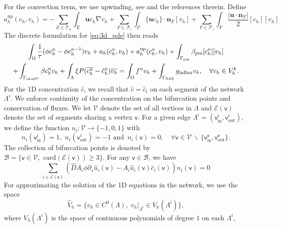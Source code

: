 \documentclass[fleqn,10pt]{wlscirep}
\newcommand{\spinal}{\Gamma_{\rm SAS}}
\newcommand{\gin}{g_{\rm{influx}}}
\begin{document}
For the convection term, we use upwinding, see \cite[Section 2.3.1]{di2011mathematical} and the references therein. Define 
\begin{equation*}
a_h^{\mathrm{up}}(c_h, v_h) =- \sum_{E\in\mathcal{T}_h } \int_E \bm{u} c_h \nabla v_h  + \sum_{F \in \mathcal{F}_i } \int_F \{ \bm u  c_h\} \cdot \bm{n}_F [v_h]  + \sum_{F \in \mathcal{F}_i} \int_F \frac{|\bm u \cdot \bm n_F |}{2} [c_h ] [v_h ] 
\end{equation*}
The discrete formulation for \eqref{eq:3d_pde} then reads 
\begin{multline}
\int_{\Omega}\frac{1}{\tau} (\phi c_h^n - \phi c_h^{n-1}) v_h + a_h(c_h^n, v_h) + a_h^{\mathrm{up}}(c_h^n,v_h) + \int_{\Gamma_{\mathrm{pia}} } \beta_{\mathrm{pia}}[c_h^n][v_h]  \\ + \int_{\Gamma_{\rm skull^u}} \beta c_h^n v_h +  \int_{\Lambda} \xi  P (\overline{c_h^n} - \hat c_h^n) \overline{v_h}  = \int_{\Omega} f^n v_h + \int_{\spinal} \gin v_h , \quad \forall v_h \in V_h^k.
\end{multline}
For the 1D concentration $\hat c$, we recall that $\hat c = \hat c_i $ on each segment of the network $\Lambda^i$.  We enforce continuity of the concentration on the bifurcation points and conservation of fluxes. We let $\mathcal{V}$ denote the set of all vertices in $\Lambda$ and $ 
\mathcal{E}(\mathsf{v})$ denote the set of segments sharing a vertex $\mathsf{v}$.  For a given edge $\Lambda^i= (\mathsf{v}_\mathrm{in}^i, \mathsf{v}_{\mathrm{out}}^{i})$, we define the function $n_i: \mathcal{V} \rightarrow \{-1,0,1\}$ with $$
n_i(\mathsf{v}_{\mathrm{in}}^i) = 1 , \,\, n _i (\mathsf{v}_{\mathrm{out}}^i) = -1 \,\, \mathrm{and} \,\,\, n_i(\mathsf{v}) = 0, \quad \forall \mathsf{v} \in 
\mathcal{V} \,  \backslash \,  \{ \mathsf{v}_{\mathrm{in}}^\mathsf e,\mathsf{v}_{\mathrm{out}}^\mathsf e \}.  
$$
The collection of bifurcation points is denoted by $\mathcal{B} = \{ \mathsf{v} \in \mathcal{V}, \,\,  \mathrm{card}(\mathcal{E}(\mathsf{v})) \geq  3\}$. For any $\mathsf{v} \in \mathcal{B}$, we have 
\begin{equation}
\sum_{ i \in \mathcal{E}(\mathsf{v})} (\hat D A_i \phi \partial_s \hat{u}_i(\mathsf{v})  -  A_i \hat u_i(\mathsf{v}) \hat c_i(\mathsf{v})) n_i(\mathsf{v}) = 0  \label{eq:flux_conservation}
\end{equation}
For approximating the solution of the 1D equations in the network, we use the space 
\[ \hat V_h = \{ v_h \in C^0(\Lambda), 
\; v_h \vert_{\Lambda^i} \in V_h(\Lambda^i)
\}, 
\]
where $V_h(\Lambda^i)$ is the space of continuous polynomials of degree $1$ on each $\Lambda^i$, 
\end{document}
